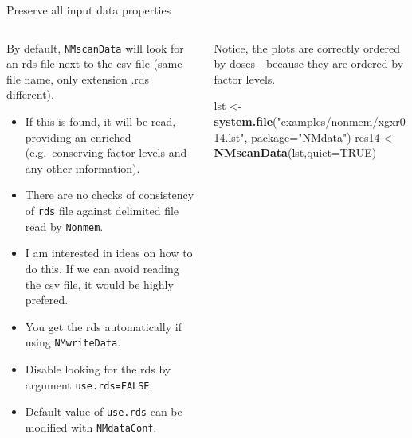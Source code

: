 \documentclass[
  8pt,
  ignorenonframetext,
  aspectratio=169]{beamer}
\newenvironment{Shaded}{\begin{snugshade}}{\end{snugshade}}
\newcommand{\DataTypeTok}[1]{\textcolor[rgb]{0.13,0.29,0.53}{#1}}
\newcommand{\KeywordTok}[1]{\textcolor[rgb]{0.13,0.29,0.53}{\textbf{#1}}}
\newcommand{\NormalTok}[1]{#1}
\newcommand{\OtherTok}[1]{\textcolor[rgb]{0.56,0.35,0.01}{#1}}
\newcommand{\StringTok}[1]{\textcolor[rgb]{0.31,0.60,0.02}{#1}}
\begin{document}
\begin{frame}[fragile]{Preserve all input data properties}
\protect\hypertarget{preserve-all-input-data-properties}{}
\begin{columns}[T]
\begin{column}{0.48\textwidth}
By default, \texttt{NMscanData} will look for an rds file next to the
csv file (same file name, only extension .rds different).

\begin{itemize}
\item
  If this is found, it will be read, providing an enriched
  (e.g.~conserving factor levels and any other information).
\item
  There are no checks of consistency of \texttt{rds} file against
  delimited file read by \texttt{Nonmem}.
\item
  I am interested in ideas on how to do this. If we can avoid reading
  the csv file, it would be highly prefered.
\item
  You get the rds automatically if using \texttt{NMwriteData}.
\item
  Disable looking for the rds by argument \texttt{use.rds=FALSE}.
\item
  Default value of \texttt{use.rds} can be modified with
  \texttt{NMdataConf}.
\end{itemize}
\end{column}

\begin{column}{0.48\textwidth}
Notice, the plots are correctly ordered by doses - because they are
ordered by factor levels.

\footnotesize

\begin{Shaded}
\begin{Highlighting}[]
\NormalTok{lst \textless{}{-}}\StringTok{ }\KeywordTok{system.file}\NormalTok{(}\StringTok{"examples/nonmem/xgxr014.lst"}\NormalTok{,}
                   \DataTypeTok{package=}\StringTok{"NMdata"}\NormalTok{)}
\NormalTok{res14 \textless{}{-}}\StringTok{ }\KeywordTok{NMscanData}\NormalTok{(lst,}\DataTypeTok{quiet=}\OtherTok{TRUE}\NormalTok{)}
\end{Highlighting}
\end{Shaded}


\end{column}
\end{columns}
\end{frame}
\end{document}
